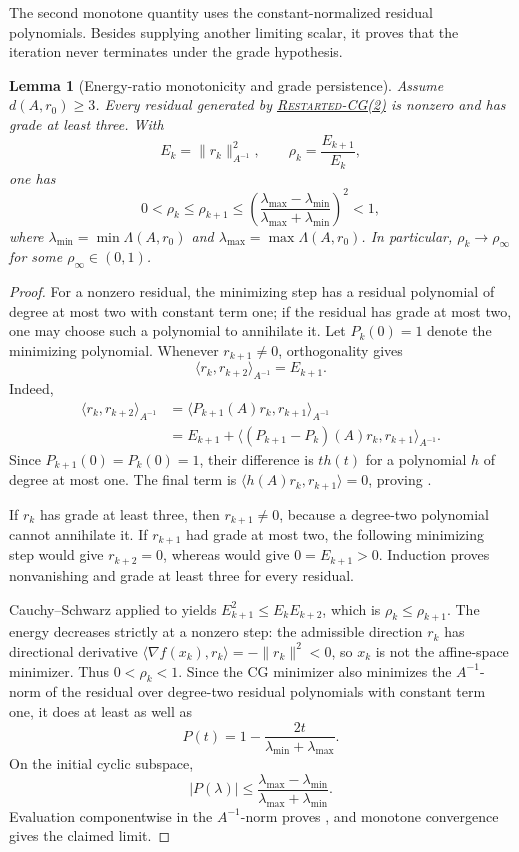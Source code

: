 \documentclass[11pt]{article}
\newtheorem{lemma}{Lemma}[section]
\begin{document}
The second monotone quantity uses the constant-normalized residual
polynomials.  Besides supplying another limiting scalar, it proves that the
iteration never terminates under the grade hypothesis.

\begin{lemma}[Energy-ratio monotonicity and grade persistence]
\label{lem:energy-ratio}
Assume \(d(A,r_0)\geq3\).  Every residual generated by
\hyperref[alg:restarted-cg2]{\textsc{Restarted-CG(2)}} is nonzero and has
grade at least three.  With
\[
 E_k=\lVert r_k\rVert_{A^{-1}}^2,\qquad
 \rho_k=\frac{E_{k+1}}{E_k},
\]
one has
\[
 0<\rho_k\leq\rho_{k+1}\leq
 \left(\frac{\lambda_{\max}-\lambda_{\min}}
 {\lambda_{\max}+\lambda_{\min}}\right)^2<1,
\tag{5}\label{eq:energy-ratio-bound}
\]
where
\(\lambda_{\min}=\min\Lambda(A,r_0)\) and
\(\lambda_{\max}=\max\Lambda(A,r_0)\).  In particular,
\(\rho_k\to\rho_\infty\) for some \(\rho_\infty\in(0,1)\).
\end{lemma}

\begin{proof}
For a nonzero residual, the minimizing step has a residual polynomial of
degree at most two with constant term one; if the residual has grade at most
two, one may choose such a polynomial to annihilate it.  Let \(P_k(0)=1\)
denote the minimizing polynomial.  Whenever \(r_{k+1}\neq0\),
orthogonality gives
\[
 \langle r_k,r_{k+2}\rangle_{A^{-1}}=E_{k+1}.
\tag{6}\label{eq:energy-cross-identity}
\]
Indeed,
\[
 \begin{aligned}
 \langle r_k,r_{k+2}\rangle_{A^{-1}}
 &=\langle P_{k+1}(A)r_k,r_{k+1}\rangle_{A^{-1}}\\
 &=E_{k+1}
 +\langle(P_{k+1}-P_k)(A)r_k,r_{k+1}\rangle_{A^{-1}}.
 \end{aligned}
\]
Since \(P_{k+1}(0)=P_k(0)=1\), their difference is \(t h(t)\) for a
polynomial \(h\) of degree at most one.  The final term is
\(\langle h(A)r_k,r_{k+1}\rangle=0\), proving
.

If \(r_k\) has grade at least three, then \(r_{k+1}\neq0\), because a
degree-two polynomial cannot annihilate it.  If \(r_{k+1}\) had grade at
most two, the following minimizing step would give \(r_{k+2}=0\), whereas
 would give \(0=E_{k+1}>0\).
Induction proves nonvanishing and grade at least three for every residual.

Cauchy--Schwarz applied to  yields
\(E_{k+1}^2\leq E_kE_{k+2}\), which is
\(\rho_k\leq\rho_{k+1}\).  The energy decreases strictly at a nonzero
step: the admissible direction \(r_k\) has directional derivative
\(\langle\nabla f(x_k),r_k\rangle=-\lVert r_k\rVert^2<0\), so \(x_k\)
is not the affine-space minimizer.  Thus \(0<\rho_k<1\).  Since the CG
minimizer also minimizes the
\(A^{-1}\)-norm of the residual over degree-two residual polynomials with
constant term one, it does at least as well as
\[
 P(t)=1-\frac{2t}{\lambda_{\min}+\lambda_{\max}}.
\]
On the initial cyclic subspace,
\[
 |P(\lambda)|\leq
 \frac{\lambda_{\max}-\lambda_{\min}}
      {\lambda_{\max}+\lambda_{\min}}.
\]
Evaluation componentwise in the \(A^{-1}\)-norm proves
, and monotone convergence gives the claimed
limit.
\end{proof}
\end{document}
